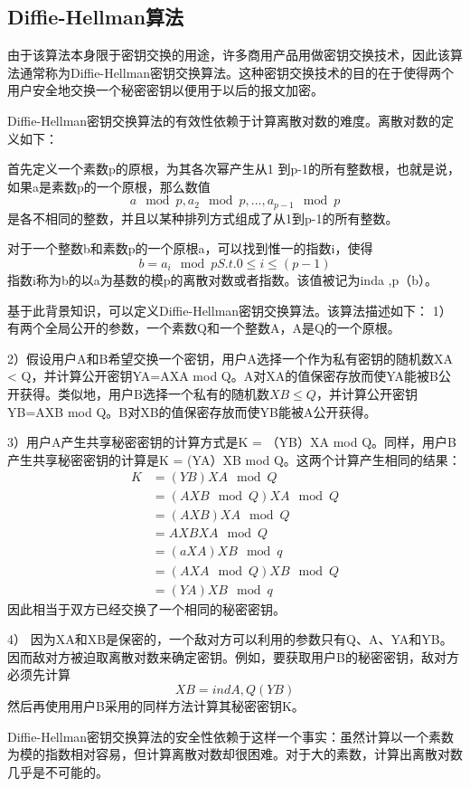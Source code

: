 \documentclass[UTF8,a4paper,10pt, twocolumn]{ctexart}
\begin{document}
\subsection{Diffie-Hellman算法}

由于该算法本身限于密钥交换的用途，许多商用产品用做密钥交换技术，因此该算法通常称为Diffie-Hellman密钥交换算法。这种密钥交换技术的目的在于使得两个用户安全地交换一个秘密密钥以便用于以后的报文加密。

Diffie-Hellman密钥交换算法的有效性依赖于计算离散对数的难度。离散对数的定义如下：

首先定义一个素数p的原根，为其各次幂产生从1 到p-1的所有整数根，也就是说，如果a是素数p的一个原根，那么数值
$$ a \mod p, a_2 \mod p, ..., a_{p-1} \mod p $$
是各不相同的整数，并且以某种排列方式组成了从1到p-1的所有整数。

对于一个整数b和素数p的一个原根a，可以找到惟一的指数i，使得
$$ b = a_i \mod p     S.t. 0 \leq i \leq(p-1) $$
指数i称为b的以a为基数的模p的离散对数或者指数。该值被记为inda ,p（b）。

基于此背景知识，可以定义Diffie-Hellman密钥交换算法。该算法描述如下：
1）有两个全局公开的参数，一个素数Q和一个整数A，A是Q的一个原根。

2）假设用户A和B希望交换一个密钥，用户A选择一个作为私有密钥的随机数XA < Q，并计算公开密钥YA=AXA mod Q。A对XA的值保密存放而使YA能被B公开获得。类似地，用户B选择一个私有的随机数$ XB \le Q $，并计算公开密钥YB=AXB mod Q。B对XB的值保密存放而使YB能被A公开获得。

3）用户A产生共享秘密密钥的计算方式是K = （YB）XA mod Q。同样，用户B产生共享秘密密钥的计算是K = (YA）XB mod Q。这两个计算产生相同的结果：
\begin{align}
	K &= (YB)XA \mod Q \\
	&= (AXB \mod Q)XA \mod Q \\
	&= (AXB)XA \mod Q \\
	&= AXBXA \mod Q \\
	&= (aXA)XB \mod q \\
	&= (AXA \mod Q)XB \mod Q \\
	&= (YA)XB \mod q
\end{align}
因此相当于双方已经交换了一个相同的秘密密钥。

4） 因为XA和XB是保密的，一个敌对方可以利用的参数只有Q、A、YA和YB。因而敌对方被迫取离散对数来确定密钥。例如，要获取用户B的秘密密钥，敌对方必须先计算
$$  XB = indA ,Q(YB) $$
然后再使用用户B采用的同样方法计算其秘密密钥K。

Diffie-Hellman密钥交换算法的安全性依赖于这样一个事实：虽然计算以一个素数为模的指数相对容易，但计算离散对数却很困难。对于大的素数，计算出离散对数几乎是不可能的。
\end{document}
